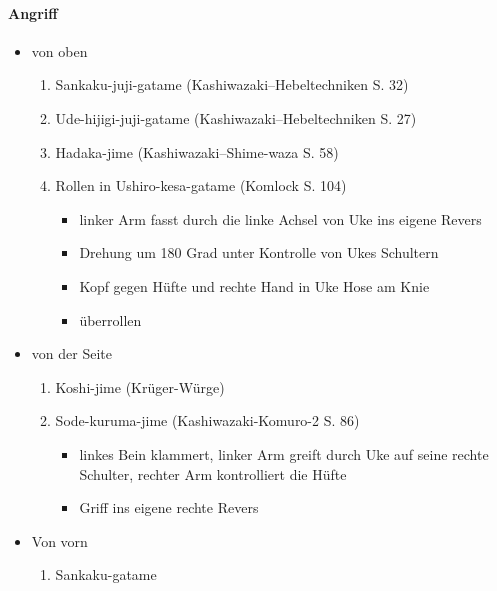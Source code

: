 \documentclass[justified, a4paper, notitlepage, captions=tableheading, nobib]{tufte-handout}
\begin{document}
\paragraph{Angriff}
\label{sec:org998fcd5}
\begin{itemize}
\item von oben
\begin{enumerate}
\item Sankaku-juji-gatame (Kashiwazaki--Hebeltechniken S. 32)
\item Ude-hijigi-juji-gatame (Kashiwazaki--Hebeltechniken S. 27)
\item Hadaka-jime (Kashiwazaki--Shime-waza S. 58)
\item Rollen in Ushiro-kesa-gatame (Komlock S. 104)
\begin{itemize}
\item linker Arm fasst durch die linke Achsel von Uke ins eigene Revers
\item Drehung um 180 Grad unter Kontrolle von Ukes Schultern
\item Kopf gegen Hüfte und rechte Hand in Uke Hose am Knie
\item überrollen
\end{itemize}
\end{enumerate}
\item von der Seite
\begin{enumerate}
\item Koshi-jime (Krüger-Würge)
\item Sode-kuruma-jime (Kashiwazaki-Komuro-2 S. 86)
\begin{itemize}
\item linkes Bein klammert, linker Arm greift durch Uke auf seine rechte Schulter, rechter Arm kontrolliert die Hüfte
\item Griff ins eigene rechte Revers
\end{itemize}
\end{enumerate}
\item Von vorn
\begin{enumerate}
\item Sankaku-gatame
\end{enumerate}
\end{itemize}
\end{document}
